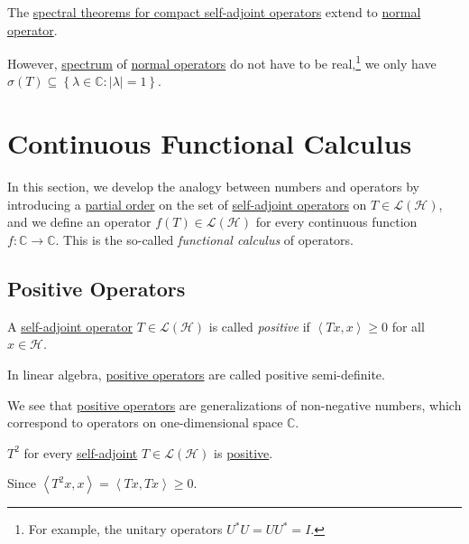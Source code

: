 \begin{remark}
	The \hyperref[thm:spectral-theorem-for-compact-self-adjoint-op]{spectral theorems for compact self-adjoint operators} extend to \hyperref[def:normal-op]{normal operator}.
\end{remark}

However, \hyperref[def:spectrum-point]{spectrum} of \hyperref[def:normal-op]{normal operators} do not have to be real,\footnote{For example, the unitary operators \(U^{\ast} U = U U^{\ast} = I\).} we only have \(\sigma (T) \subseteq \left\{ \lambda \in \mathbb{C} \colon \vert \lambda  \vert =1 \right\} \).

\section{Continuous Functional Calculus}
In this section, we develop the analogy between numbers and operators by introducing a \hyperref[def:partial-order]{partial order} on the set of \hyperref[def:self-adjoint-op]{self-adjoint operators} on \(T\in \mathcal{L} (\mathcal{H} )\), and we define an operator \(f(T) \in \mathcal{L} (\mathcal{H} )\) for every continuous function \(f\colon \mathbb{C} \to \mathbb{C} \). This is the so-called \emph{functional calculus} of operators.

\subsection{Positive Operators}
\begin{definition}\label{def:positive-op}
	A \hyperref[def:self-adjoint-op]{self-adjoint operator} \(T\in \mathcal{L} (\mathcal{H} )\) is called \emph{positive} if \(\left\langle Tx, x \right\rangle \geq 0\) for all \(x\in \mathcal{H} \).
\end{definition}

\begin{remark}
	In linear algebra, \hyperref[def:positive-op]{positive operators} are called positive semi-definite.
\end{remark}

We see that \hyperref[def:positive-op]{positive operators} are generalizations of non-negative numbers, which correspond to operators on one-dimensional space \(\mathbb{C} \).

\begin{eg}
	\(T^2\) for every \hyperref[def:self-adjoint-op]{self-adjoint} \(T\in \mathcal{L} (\mathcal{H} )\) is \hyperref[def:positive-op]{positive}.
\end{eg}
\begin{explanation}
	Since \(\left\langle T^2 x, x \right\rangle = \left\langle Tx, Tx \right\rangle \geq 0\).
\end{explanation}

